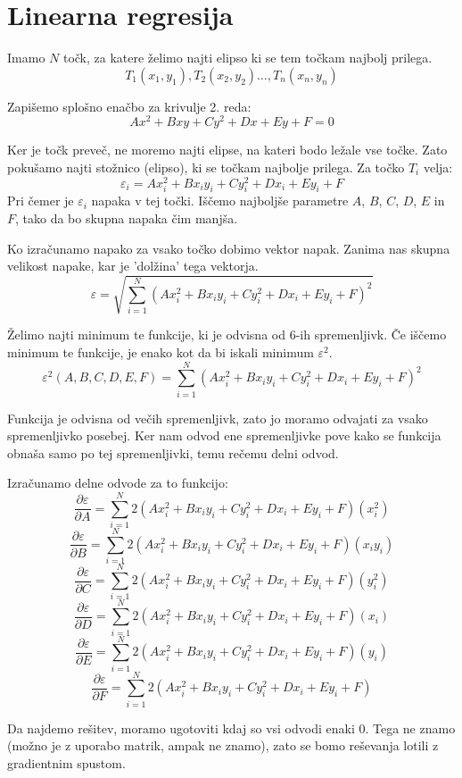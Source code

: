 \documentclass[a4paper, 12pt]{article}
\begin{document}
	\section*{Linearna regresija}
	Imamo $N$ točk, za katere želimo najti elipso ki se tem točkam najbolj prilega.
	$$T_1(x_1, y_1), T_2(x_2, y_2) \ldots, T_n(x_n, y_n)$$

	Zapišemo splošno enačbo za krivulje 2. reda:
	$$Ax^2 + Bxy + Cy^2 + Dx + Ey + F = 0$$

	Ker je točk preveč, ne moremo najti elipse, na kateri bodo ležale vse točke. Zato pokušamo najti stožnico (elipso), ki se točkam najbolje prilega. Za točko $T_i$ velja:
	$$\varepsilon_i = Ax_i^2 + Bx_iy_i + Cy_i^2 + Dx_i + Ey_i + F$$
	Pri čemer je $\varepsilon_i$ napaka v tej točki. Iščemo najboljše parametre $A$, $B$, $C$, $D$, $E$ in $F$, tako da bo skupna napaka čim manjša.

	Ko izračunamo napako za vsako točko dobimo vektor napak. Zanima nas skupna velikost napake, kar je 'dolžina' tega vektorja.
	$$\varepsilon = \sqrt{\sum_{i=1}^{N} (Ax_i^2 + Bx_iy_i + Cy_i^2 + Dx_i + Ey_i + F)^2}$$

	Želimo najti minimum te funkcije, ki je odvisna od 6-ih spremenljivk. Če iščemo minimum te funkcije, je enako kot da bi iskali minimum $\varepsilon^{2}$.
	$$\varepsilon^2(A, B, C, D, E, F) = \sum_{i=1}^{N} (Ax_i^2 + Bx_iy_i + Cy_i^2 + Dx_i + Ey_i + F)^2$$

	Funkcija je odvisna od večih spremenljivk, zato jo moramo odvajati za vsako spremenljivko posebej. Ker nam odvod ene spremenljivke pove kako se funkcija obnaša samo po tej spremenljivki, temu rečemu delni odvod.
	
	Izračunamo delne odvode za to funkcijo:
	$$\frac{\partial \varepsilon}{\partial A} = \sum_{i=1}^{N}2(Ax_i^2 + Bx_iy_i + Cy_i^2 + Dx_i + Ey_i + F)(x_i^2)$$
	$$\frac{\partial \varepsilon}{\partial B} = \sum_{i=1}^{N}2(Ax_i^2 + Bx_iy_i + Cy_i^2 + Dx_i + Ey_i + F)(x_iy_i)$$
	$$\frac{\partial \varepsilon}{\partial C} = \sum_{i=1}^{N}2(Ax_i^2 + Bx_iy_i + Cy_i^2 + Dx_i + Ey_i + F)(y_i^2)$$
	$$\frac{\partial \varepsilon}{\partial D} = \sum_{i=1}^{N}2(Ax_i^2 + Bx_iy_i + Cy_i^2 + Dx_i + Ey_i + F)(x_i)$$
	$$\frac{\partial \varepsilon}{\partial E} = \sum_{i=1}^{N}2(Ax_i^2 + Bx_iy_i + Cy_i^2 + Dx_i + Ey_i + F)(y_i)$$
	$$\frac{\partial \varepsilon}{\partial F} = \sum_{i=1}^{N}2(Ax_i^2 + Bx_iy_i + Cy_i^2 + Dx_i + Ey_i + F)$$

	Da najdemo rešitev, moramo ugotoviti kdaj so vsi odvodi enaki 0. Tega ne znamo (možno je z uporabo matrik, ampak ne znamo), zato se bomo reševanja lotili z gradientnim spustom.
\end{document}
